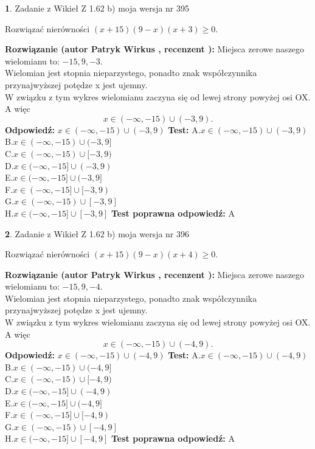 \documentclass[12pt, a4paper]{article}
\theoremstyle{definition} %
\newtheorem{zad}{}
\newcommand{\zadStart}[1]{\begin{zad}#1\newline}
\newcommand{\zadStop}{\end{zad}}
\newcommand{\rozwStart}[2]{\noindent \textbf{Rozwiązanie (autor #1 , recenzent #2): }\newline}
\newcommand{\rozwStop}{\newline}
\newcommand{\odpStart}{\noindent \textbf{Odpowiedź:}\newline}
\newcommand{\odpStop}{\newline}
\newcommand{\testStart}{\noindent \textbf{Test:}\newline}
\newcommand{\testStop}{\newline}
\newcommand{\kluczStart}{\noindent \textbf{Test poprawna odpowiedź:}\newline}
\newcommand{\kluczStop}{\newline}
\begin{document}
\zadStart{Zadanie z Wikieł Z 1.62 b) moja wersja nr 395}

Rozwiązać nierówności $(x+15)(9-x)(x+3)\ge0$.
\zadStop
\rozwStart{Patryk Wirkus}{}
Miejsca zerowe naszego wielomianu to: $-15, 9, -3$.\\
Wielomian jest stopnia nieparzystego, ponadto znak współczynnika przy\linebreak najwyższej potędze x jest ujemny.\\ W związku z tym wykres wielomianu zaczyna się od lewej strony powyżej osi OX. A więc $$x \in (-\infty,-15) \cup (-3,9).$$
\rozwStop
\odpStart
$x \in (-\infty,-15) \cup (-3,9)$
\odpStop
\testStart
A.$x \in (-\infty,-15) \cup (-3,9)$\\
B.$x \in (-\infty,-15) \cup (-3,9]$\\
C.$x \in (-\infty,-15) \cup [-3,9)$\\
D.$x \in (-\infty,-15] \cup (-3,9)$\\
E.$x \in (-\infty,-15] \cup (-3,9]$\\
F.$x \in (-\infty,-15] \cup [-3,9)$\\
G.$x \in (-\infty,-15) \cup [-3,9]$\\
H.$x \in (-\infty,-15] \cup [-3,9]$
\testStop
\kluczStart
A
\kluczStop



\zadStart{Zadanie z Wikieł Z 1.62 b) moja wersja nr 396}

Rozwiązać nierówności $(x+15)(9-x)(x+4)\ge0$.
\zadStop
\rozwStart{Patryk Wirkus}{}
Miejsca zerowe naszego wielomianu to: $-15, 9, -4$.\\
Wielomian jest stopnia nieparzystego, ponadto znak współczynnika przy\linebreak najwyższej potędze x jest ujemny.\\ W związku z tym wykres wielomianu zaczyna się od lewej strony powyżej osi OX. A więc $$x \in (-\infty,-15) \cup (-4,9).$$
\rozwStop
\odpStart
$x \in (-\infty,-15) \cup (-4,9)$
\odpStop
\testStart
A.$x \in (-\infty,-15) \cup (-4,9)$\\
B.$x \in (-\infty,-15) \cup (-4,9]$\\
C.$x \in (-\infty,-15) \cup [-4,9)$\\
D.$x \in (-\infty,-15] \cup (-4,9)$\\
E.$x \in (-\infty,-15] \cup (-4,9]$\\
F.$x \in (-\infty,-15] \cup [-4,9)$\\
G.$x \in (-\infty,-15) \cup [-4,9]$\\
H.$x \in (-\infty,-15] \cup [-4,9]$
\testStop
\kluczStart
A
\kluczStop
\end{document}
